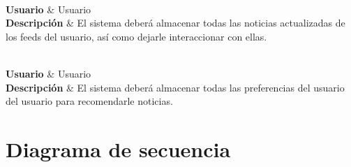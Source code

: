 {
     \\
    \hline
    \textbf{Usuario} & Usuario  \\
    \textbf{Descripción} & El sistema deberá almacenar todas las noticias actualizadas de los feeds del usuario, así como dejarle interaccionar con ellas. \\
}

{
     \\
    \hline
    \textbf{Usuario} & Usuario  \\
    \textbf{Descripción} & El sistema deberá almacenar todas las preferencias del usuario del usuario para recomendarle noticias. \\
}



\section{Diagrama de secuencia}\label{sec:diagrama_secuencia}